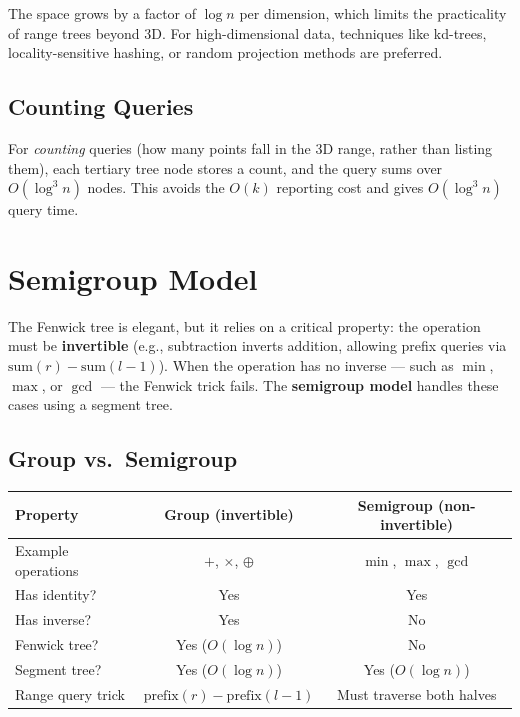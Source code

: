 The space grows by a factor of $\log n$ per dimension, which limits the practicality of range trees beyond 3D. For high-dimensional data, techniques like kd-trees, locality-sensitive hashing, or random projection methods are preferred.

\subsection{Counting Queries}

For \emph{counting} queries (how many points fall in the 3D range, rather than listing them), each tertiary tree node stores a count, and the query sums over $O(\log^3 n)$ nodes. This avoids the $O(k)$ reporting cost and gives $O(\log^3 n)$ query time.

\section{Semigroup Model}
\label{sec:semigroup-model}

The Fenwick tree is elegant, but it relies on a critical property: the operation must be \textbf{invertible} (e.g., subtraction inverts addition, allowing prefix queries via $\text{sum}(r) - \text{sum}(l-1)$). When the operation has no inverse --- such as $\min$, $\max$, or $\gcd$ --- the Fenwick trick fails. The \textbf{semigroup model} handles these cases using a segment tree.

\subsection{Group vs.\ Semigroup}

\begin{center}
\begin{tabular}{lcc}
\toprule
Property & Group (invertible) & Semigroup (non-invertible) \\
\midrule
Example operations & $+$, $\times$, $\oplus$ & $\min$, $\max$, $\gcd$ \\
Has identity? & Yes & Yes \\
Has inverse? & Yes & No \\
Fenwick tree? & Yes ($O(\log n)$) & No \\
Segment tree? & Yes ($O(\log n)$) & Yes ($O(\log n)$) \\
Range query trick & $\text{prefix}(r) - \text{prefix}(l-1)$ & Must traverse both halves \\
\bottomrule
\end{tabular}
\end{center}

